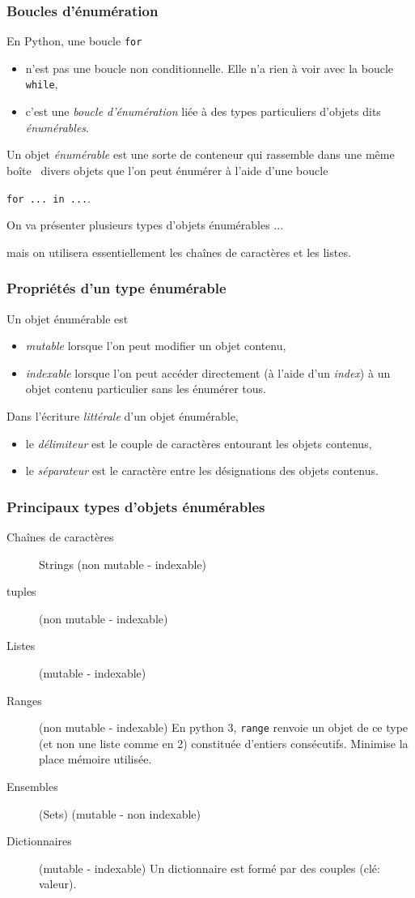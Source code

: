 



\begin{frame}
  \frametitle{Boucles d'énumération}
En Python, une boucle \texttt{for}
\begin{itemize}
  \item  n'est pas une boucle non conditionnelle. Elle n'a rien à voir avec la boucle \texttt{while},
  \item  c'est une \emph{boucle d'énumération} liée à des types particuliers d'objets dits \emph{énumérables}.
\end{itemize}
Un objet \emph{énumérable} est une sorte de conteneur qui rassemble \og dans une même boîte\fg~ divers objets que l'on peut énumérer  à l'aide d'une boucle
\begin{center}
\texttt{for ... in ...}.  
\end{center}
On va présenter plusieurs types d'objets énumérables ...

mais on utilisera essentiellement les chaînes de caractères et les listes.
\end{frame}

\begin{frame}
  \frametitle{Propriétés d'un type énumérable}
Un objet énumérable est
\begin{itemize}
  \item \emph{mutable} lorsque l'on peut modifier un objet contenu,
  \item \emph{indexable} lorsque l'on peut accéder directement (à l'aide d'un \emph{index}) à un objet contenu particulier sans les énumérer tous.
\end{itemize}

Dans l'écriture \emph{littérale} d'un objet énumérable,
\begin{itemize}
  \item le \emph{délimiteur} est le couple de caractères entourant les objets contenus,
  \item le \emph{séparateur} est le caractère entre les désignations des objets contenus.
\end{itemize}
\end{frame}

\begin{frame}
  \frametitle{Principaux types d'objets énumérables}
\begin{description}
 \item [Chaînes de caractères] Strings (non mutable - indexable) 
 \item [tuples] (non mutable - indexable) 
 \item [Listes] (mutable - indexable)
 \item [Ranges] (non mutable - indexable) En python 3, \texttt{range} renvoie un objet de ce type (et non une liste comme en 2) constituée d'entiers consécutifs. Minimise la place mémoire utilisée.
 \item [Ensembles] (Sets) (mutable - non indexable) 
 \item [Dictionnaires] (mutable - indexable) Un dictionnaire est formé par des couples (clé: valeur). 
\end{description}
\end{frame}

